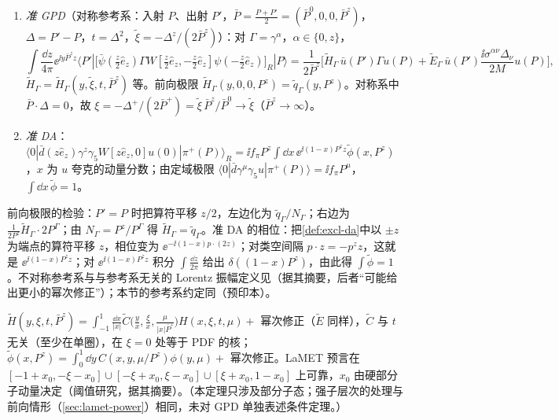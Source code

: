 \begin{definition}[准 GPD 与准 DA]\label{def:lamet-quasi-gpd}
\begin{enumerate}[label=(\roman*),leftmargin=2em,itemsep=1pt,topsep=2pt]
\item \emph{准 GPD}（对称参考系：入射 $P$、出射 $P'$，$\bar P=\frac{P+P'}2=(\bar P^0,0,0,\bar P^z)$，$\Delta=P'-P$，$t=\Delta^2$，$\tilde\xi=-\Delta^z/(2\bar P^z)$）：对 $\Gamma=\gamma^\alpha$，$\alpha\in\{0,z\}$，
\begin{equation}\label{eq:lamet-quasi-gpd}
\int\frac{\dd z}{4\pi}\ee^{\ii y\bar P^zz}\langle P'|\big[\bar\psi(\tfrac z2\hat e_z)\Gamma W[\tfrac z2\hat e_z,-\tfrac z2\hat e_z]\psi(-\tfrac z2\hat e_z)\big]_R|P\rangle=\frac1{2\bar P^z}\Big[\tilde H_\Gamma\,\bar u(P')\Gamma u(P)+\tilde E_\Gamma\,\bar u(P')\frac{\ii\sigma^{\alpha\nu}\Delta_\nu}{2M}u(P)\Big],
\end{equation}
$\tilde H_\Gamma=\tilde H_\Gamma(y,\tilde\xi,t,\bar P^z)$ 等。前向极限 $\tilde H_\Gamma(y,0,0,P^z)=\tilde q_\Gamma(y,P^z)$。对称系中 $\bar P\cdot\Delta=0$，故 $\xi=-\Delta^+/(2\bar P^+)=\tilde\xi\,\bar P^z/\bar P^0\to\tilde\xi$（$\bar P^z\to\infty$）。
\item \emph{准 DA}：$\langle0|\bar d(z\hat e_z)\gamma^z\gamma_5W[z\hat e_z,0]u(0)|\pi^+(P)\rangle_R=\ii f_\pi P^z\int\dd x\,\ee^{\ii(1-x)P^zz}\tilde\phi(x,P^z)$，$x$ 为 $u$ 夸克的动量分数；由定域极限 $\langle0|\bar d\gamma^\mu\gamma_5u|\pi^+(P)\rangle=\ii f_\pi P^\mu$，$\int\dd x\,\tilde\phi=1$。
\end{enumerate}
\end{definition}

前向极限的检验：$P'=P$ 时把算符平移 $z/2$，左边化为 $\tilde q_\Gamma/N_\Gamma$；右边为 $\frac1{2P^z}\tilde H_\Gamma\cdot2P^\Gamma$；由 $N_\Gamma=P^z/P^\Gamma$ 得 $\tilde H_\Gamma=\tilde q_\Gamma$。准 DA 的相位：把\cref{def:excl-da}中以 $\pm z$ 为端点的算符平移 $z$，相位变为 $\ee^{-\ii(1-x)p\cdot(2z)}$；对类空间隔 $p\cdot z=-p^zz$，这就是 $\ee^{\ii(1-x)P^zz}$；对 $\ee^{\ii(1-x)P^zz}$ 积分 $\int\frac{\dd z}{2\pi}$ 给出 $\delta((1-x)P^z)$，由此得 $\int\tilde\phi=1$。不对称参考系与与参考系无关的 Lorentz 振幅定义见\cite{Bhattacharya:2022aob}（据其摘要，后者“可能给出更小的幂次修正”）；本节的参考系约定同\cite{Su:2026eta}（预印本）。

\begin{theorem}\label{thm:lamet-quasi-gpd}
$\tilde H(y,\xi,t,\bar P^z)=\int_{-1}^1\frac{\dd x}{|x|}\tilde C\big(\frac yx,\frac\xi x,\frac\mu{|x|\bar P^z}\big)H(x,\xi,t,\mu)+$ 幂次修正（$\tilde E$ 同样），$\tilde C$ 与 $t$ 无关（至少在单圈），在 $\xi=0$ 处等于 PDF 的核；$\tilde\phi(x,P^z)=\int_0^1\dd y\,C(x,y,\mu/P^z)\phi(y,\mu)+$ 幂次修正。LaMET 预言在 $[-1+x_0,-\xi-x_0]\cup[-\xi+x_0,\xi-x_0]\cup[\xi+x_0,1-x_0]$ 上可靠，$x_0$ 由硬部分子动量决定\cite{Holligan:2025baj}（阈值研究，据其摘要）。（本定理只涉及部分子态；强子层次的处理与前向情形（\cref{sec:lamet-power}）相同，未对 GPD 单独表述条件定理。）
\end{theorem}

